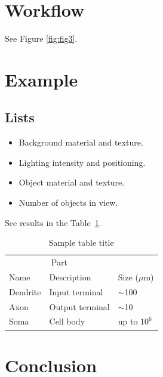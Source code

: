 \documentclass{article}
\begin{document}
\section{Workflow}
\label{sec:workflow}
See Figure \ref{fig:fig3}.

\section{Example}
\label{sec:example}

\subsection{Lists}
\begin{itemize}
	\item Background material and texture.
	\item Lighting intensity and positioning.
	\item Object material and texture.
	\item Number of objects in view.
\end{itemize}

See results in the Table~\ref{tab:table}.

\begin{table}
	\caption{Sample table title}
	\centering
	\begin{tabular}{lll}
		\toprule
		\multicolumn{2}{c}{Part}                   \\
		\cmidrule(r){1-2}
		Name     & Description     & Size ($\mu$m) \\
		\midrule
		Dendrite & Input terminal  & $\sim$100     \\
		Axon     & Output terminal & $\sim$10      \\
		Soma     & Cell body       & up to $10^6$  \\
		\bottomrule
	\end{tabular}
	\label{tab:table}
\end{table}

\section{Conclusion}
\label{sec:conclusion}
\lipsum[2]



\end{document}
